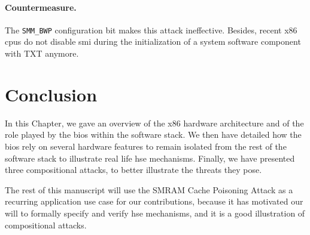 \paragraph{Countermeasure.}
%
The \texttt{SMM\_BWP} configuration bit makes this attack ineffective.
%
Besides, recent x86 \acp{cpu} do not disable \ac{smi} during the initialization of a
system software component with TXT anymore.

\section{Conclusion}
\label{sec:usecase:conclusion}

In this Chapter, we gave an overview of the x86 hardware architecture and of the
role played by the \ac{bios} within the software stack.
%
We then have detailed how the \ac{bios} rely on several hardware features to
remain isolated from the rest of the software stack to illustrate real life
\ac{hse} mechanisms.
%
Finally, we have presented three compositional attacks, to better illustrate
the threats they pose.

The rest of this manuscript will use the SMRAM Cache Poisoning Attack as a
recurring application use case for our contributions, because it has motivated
our will to formally specify and verify \ac{hse} mechanisms, and it is a good
illustration of compositional attacks.
